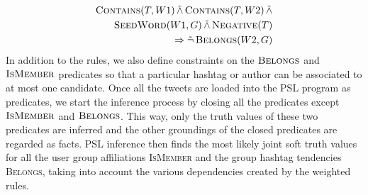 \begin{align*}
\begin{split}
\textsc{Contains}(T,W1) 
	\softand \textsc{Contains}(T,W2)
	\softand \\
	 \textsc{SeedWord}(W1,G)
	\softand \textsc{Negative}(T)\\
	\Rightarrow \softneg \textsc{Belongs}(W2,G)
\end{split}
\end{align*}
In addition to the rules, we also define constraints on the $\textsc{Belongs}$ and $\textsc{IsMember}$ predicates so that a particular hashtag or author can be associated to at most one candidate. 
Once all the tweets are loaded into the PSL program as predicates, we start the inference process by closing all the predicates except $\textsc{IsMember}$ and $\textsc{Belongs}$. 
This way, only the truth values of these two predicates are inferred and the other groundings of the closed predicates are regarded as facts.
PSL inference then finds the most likely joint soft truth values for all the user group affiliations \textsc{IsMember} and the group hashtag tendencies \textsc{Belongs}, taking into account the various dependencies created by the weighted rules.

